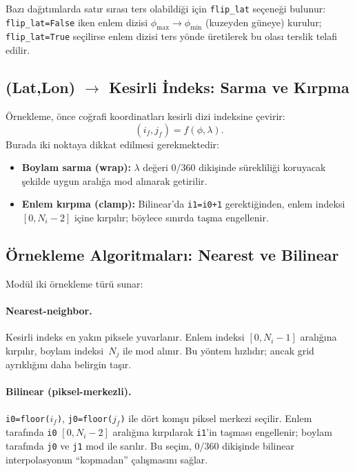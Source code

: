 Bazı dağıtımlarda satır sırası ters olabildiği için \texttt{flip\_lat} seçeneği bulunur:
\texttt{flip\_lat=False} iken enlem dizisi \(\phi_{\max}\to\phi_{\min}\) (kuzeyden güneye) kurulur;
\texttt{flip\_lat=True} seçilirse enlem dizisi ters yönde üretilerek bu olası terslik telafi edilir.

\subsection*{(Lat,Lon) \(\rightarrow\) Kesirli İndeks: Sarma ve Kırpma}
Örnekleme, önce coğrafi koordinatları kesirli dizi indeksine çevirir:
\[
(i_f, j_f) = f(\phi,\lambda).
\]
Burada iki noktaya dikkat edilmesi gerekmektedir:
\begin{itemize}
  \item \textbf{Boylam sarma (wrap):} \(\lambda\) değeri 0/360 dikişinde sürekliliği koruyacak şekilde
  uygun aralığa mod alınarak getirilir.
  \item \textbf{Enlem kırpma (clamp):} Bilinear’da \texttt{i1=i0+1} gerektiğinden,
  enlem indeksi \([0, N_i\!-\!2]\) içine kırpılır; böylece sınırda taşma engellenir.
\end{itemize}

\subsection*{Örnekleme Algoritmaları: Nearest ve Bilinear}
Modül iki örnekleme türü sunar:

\paragraph{Nearest-neighbor.}
Kesirli indeks en yakın piksele yuvarlanır.
Enlem indeksi \([0, N_i\!-\!1]\) aralığına kırpılır, boylam indeksi \(\,N_j\) ile mod alınır.
Bu yöntem hızlıdır; ancak grid ayrıklığını daha belirgin taşır.

\paragraph{Bilinear (piksel-merkezli).}
\texttt{i0=floor($i_f$)}, \texttt{j0=floor($j_f$)} ile dört komşu piksel merkezi seçilir.
Enlem tarafında \texttt{i0} \([0, N_i\!-\!2]\) aralığına kırpılarak \texttt{i1}’in taşması engellenir;
boylam tarafında \texttt{j0} ve \texttt{j1} mod ile sarılır.
Bu seçim, 0/360 dikişinde bilinear interpolasyonun ``kopmadan'' çalışmasını sağlar.


